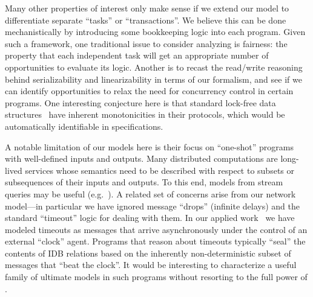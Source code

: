 Many other properties of interest only make sense if we extend our model to differentiate separate ``tasks'' or ``transactions''. We believe this can be done mechanistically by introducing some bookkeeping logic into each \lang program.  Given such a framework, one traditional issue to consider analyzing is fairness: the property that each independent task will get an appropriate number of opportunities to evaluate its logic.  Another is to recast the read/write reasoning behind serializability and linearizability in terms of our formalism, and see if we can identify opportunities to relax the need for concurrency control in certain programs.  One interesting conjecture here is that standard lock-free data structures~\cite{lockfree} have inherent monotonicities in their protocols, which would be automatically identifiable in \lang specifications.

A notable limitation of our models here is their focus on ``one-shot'' programs with well-defined inputs and outputs.  Many distributed computations are long-lived services whose semantics need to be described with respect to subsets or subsequences of their inputs and outputs.  To this end, models from stream queries may be useful (e.g.~\cite{Chandramouli:2009}).  A related set of concerns arise from our network model---in particular we have ignored message ``drops'' (infinite delays) and the standard ``timeout'' logic for dealing with them.  In our applied work~\cite{overlog,bloom} we have modeled timeouts as messages that arrive asynchronously under the control of an external ``clock'' agent.  Programs that reason about timeouts typically ``seal'' the contents of IDB relations based on the inherently non-deterministic subset of messages that ``beat the clock''.  It would be interesting to characterize a useful family of ultimate models in such programs without resorting to the full power of \lang.